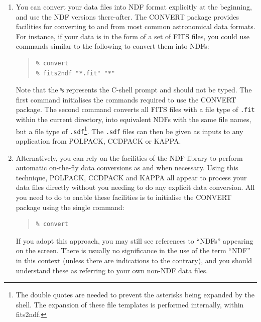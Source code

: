 \documentclass[twoside,11pt]{article}
\newcommand{\xref}[3]{#1}
\renewcommand{\_}{\texttt{\symbol{95}}}
\newenvironment{myquote}{\begin{quote}\begin{small}}{\end{small}\end{quote}}
\begin{document}
\begin{enumerate}

\item You can convert your data files into NDF format explicitly at the
beginning, and use the NDF versions there-after. The \xref{CONVERT}{sun55}{} 
package  provides facilities for converting to and
from most common astronomical data formats. For instance, if your data is
in the form of a set of FITS files, you could use commands similar to the
following to convert them into NDFs:

\begin{myquote}
\begin{verbatim}
% convert
% fits2ndf "*.fit" "*"
\end{verbatim}
\end{myquote}

Note that the \texttt{\%} represents the C-shell prompt and should not be typed.
The first command initialises the commands required to use the CONVERT
package. The second command converts all FITS files with a file type of
\verb+.fit+ within the current directory, into equivalent NDFs with the
same file names, but a file type of \verb+.sdf+\footnote{The double quotes
are needed to prevent the asterisks being expanded by the shell. The
expansion of these file templates is performed internally, within
fits2ndf.}. The \verb+.sdf+ files can then be given as inputs to
any application from POLPACK, CCDPACK or KAPPA.

\item Alternatively, you can rely on the facilities of the NDF library to perform
automatic on-the-fly data conversions as and when necessary. Using this
technique, POLPACK, CCDPACK and KAPPA all appear to process your data files
directly without you needing to do any explicit data conversion. All you
need to do to enable these facilities is to initialise the CONVERT
package using the single command:

\begin{myquote}
\begin{verbatim}
% convert
\end{verbatim}
\end{myquote}

If you adopt this approach, you may still see references to ``NDFs''
appearing on the screen. There is usually no significance in the use of
the term ``NDF'' in this context (unless there are indications to the
contrary), and you should understand these as referring to your own
non-NDF data files.

\end{enumerate}
\end{document}
